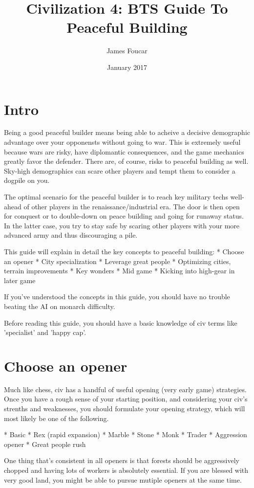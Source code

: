 \documentclass[10pt]{article}
\title{Civilization 4: BTS Guide To Peaceful Building}
\author{James Foucar}
\date{January 2017}
\begin{document}
\section*{Intro}

Being a good peaceful builder means being able to acheive a decisive demographic advantage
over your opponensts without going to war. This is extremely useful because wars are risky, have
diplomantic consequences, and the game mechanics greatly favor the defender. There are, of course,
risks to peaceful building as well. Sky-high demographics can scare other players and tempt them
to consider a dogpile on you.

The optimal scenario for the peaceful builder is to reach key military
techs well-ahead of other players in the renaissance/industrial era. The door is then open for conquest
or to double-down on peace building and going for runaway status. In the latter case, you try to stay
safe by scaring other players with your more advanced army and thus discouraging a pile.

This guide will explain in detail the key concepts to peaceful building:
* Choose an opener
* City specialization
* Leverage great people
* Optimizing cities, terrain improvements
* Key wonders
* Mid game
* Kicking into high-gear in later game

If you've understood the concepts in this guide, you should have no trouble beating the AI
on monarch difficulty.

Before reading this guide, you should have a basic knowledge of civ terms like 'specialist'
and 'happy cap'.

\section*{Choose an opener}

Much like chess, civ has a handful of useful opening (very early game) strategies. Once you
have a rough sense of your starting position, and considering your civ's strenths and weaknesses,
you should formulate your opening strategy, which will most likely be one of the following.

* Basic
* Rex (rapid expansion)
* Marble
* Stone
* Monk
* Trader
* Aggression opener
* Great people rush

One thing that's consistent in all openers is that forests should be aggressively chopped and
having lots of workers is absolutely essential. If you are blessed with very good land, you
might be able to pursue mutiple openers at the same time.
\end{document}
